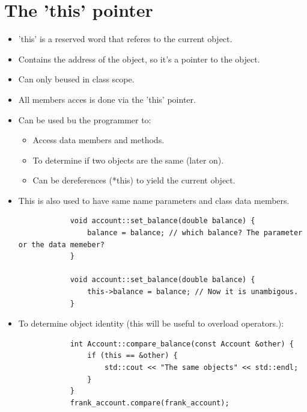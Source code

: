 \section{The 'this' pointer}
\begin{itemize}
    \item 'this' is a reserved word that referes to the current object.
    \item Contains the address of the object, so it's a pointer to the object.
    \item Can only beused in class scope.
    \item All members acces is done via the 'this' pointer.
    \item Can be used bu the programmer to: 
        \begin{itemize}
            \item Access data members and methods.
            \item To determine if two objects are the same (later on).
            \item Can be dereferences (*this) to yield the current object.
        \end{itemize}
    
    \item This is also used to have same name parameters and class data members.
        \begin{verbatim}
            void account::set_balance(double balance) {
                balance = balance; // which balance? The parameter or the data memeber?
            }

            void account::set_balance(double balance) {
                this->balance = balance; // Now it is unambigous.
            }
        \end{verbatim}
    
    \item To determine object identity (this will be useful to overload operators.):
        \begin{verbatim}
            int Account::compare_balance(const Account &other) {
                if (this == &other) {
                    std::cout << "The same objects" << std::endl;
                }
            }
            frank_account.compare(frank_account);
        \end{verbatim}
\end{itemize}


